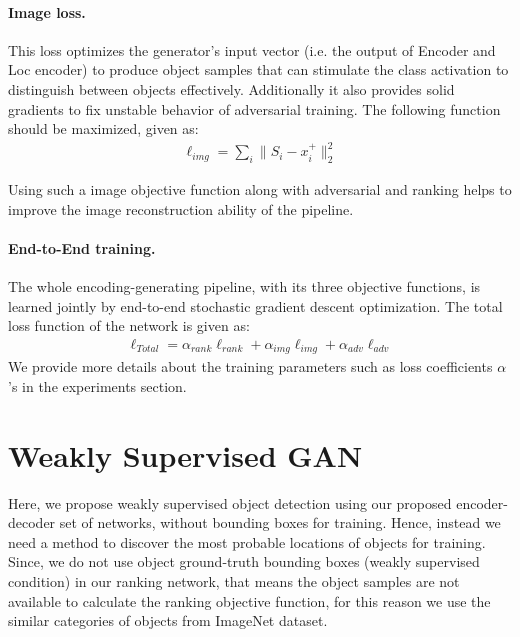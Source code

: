\documentclass[runningheads]{llncs}
\begin{document}
\paragraph{Image loss.}
This loss optimizes the generator's input vector (i.e. the output of Encoder and Loc encoder) to produce object samples that can stimulate the class activation to distinguish between objects effectively. Additionally it also provides solid gradients to fix unstable behavior of adversarial training. The following function should be maximized, given as:
\begin{equation}
\begin{split}
\ell_{img} = \sum_{i}{\|S_{i} - x_{i}^+\|^2_2 }
\end{split}
\label{eq:1}
\end{equation}

Using such a image objective function along with adversarial and ranking helps to improve the image reconstruction ability of the pipeline.

\paragraph{End-to-End training.}
The whole encoding-generating pipeline, with its three objective functions, is learned jointly by end-to-end stochastic gradient descent optimization. The total loss function of the network is given as:
\begin{equation}
\begin{split}
\ell_{Total} =  \alpha_{rank}\ell_{rank} +  \alpha_{img}\ell_{img} + \alpha_{adv}\ell_{adv}  
\end{split}
\label{eq:totalloss}
\end{equation}
\noindent We provide more details about the training parameters such as loss coefficients $\alpha$'s in the experiments section. 
 





\section{Weakly Supervised GAN} \label{sec:weakly}

Here, we propose weakly supervised object detection using our proposed encoder-decoder set of networks, without bounding boxes for training. Hence, instead we need a method to discover the most probable locations of objects for training. Since, we do not use object ground-truth bounding boxes (weakly supervised condition) in our ranking network, that means the object samples are not available to calculate the ranking objective function, for this reason we use the similar categories of objects from ImageNet dataset.
\end{document}
